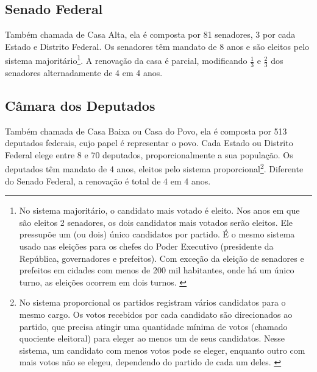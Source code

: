 \documentclass[a4paper,titlepage]{ppgi}\usepackage[]{graphicx}\usepackage[]{color}
\begin{document}
%

\subsection{Senado Federal}

Também chamada de Casa Alta, ela é composta por 81 senadores, 3 por cada Estado e Distrito Federal. Os senadores têm mandato de 8 anos e são eleitos pelo sistema majoritário\footnote{No sistema majoritário, o candidato mais votado é eleito. Nos anos em que são eleitos 2 senadores, os dois candidatos mais votados serão eleitos. Ele pressupõe um (ou dois) único candidatos por partido. É o mesmo sistema usado nas eleições para os chefes do Poder Executivo (presidente da República, governadores e prefeitos). Com exceção da eleição de senadores e prefeitos em cidades com menos de 200 mil habitantes, onde há um único turno, as eleições ocorrem em dois turnos. \cite{Carneiro2013}}. A renovação da casa é parcial, modificando $\frac{1}{3}$ e $\frac{2}{3}$ dos senadores alternadamente de 4 em 4 anos.

\subsection{Câmara dos Deputados}

Também chamada de Casa Baixa ou Casa do Povo, ela é composta por 513 deputados federais, cujo papel é representar o povo. Cada Estado ou Distrito Federal elege entre 8 e 70 deputados, proporcionalmente a sua população. Os deputados têm mandato de 4 anos, eleitos pelo sistema proporcional\footnote{No sistema proporcional os partidos registram vários candidatos para o mesmo cargo. Os votos recebidos por cada candidato são direcionados ao partido, que precisa atingir uma quantidade mínima de votos (chamado quociente eleitoral) para eleger ao menos um de seus candidatos. Nesse sistema, um candidato com menos votos pode se eleger, enquanto outro com mais votos não se elegeu, dependendo do partido de cada um deles. \cite{Carneiro2013,Bramatti2014}}. Diferente do Senado Federal, a renovação é total de 4 em 4 anos.
\end{document}
